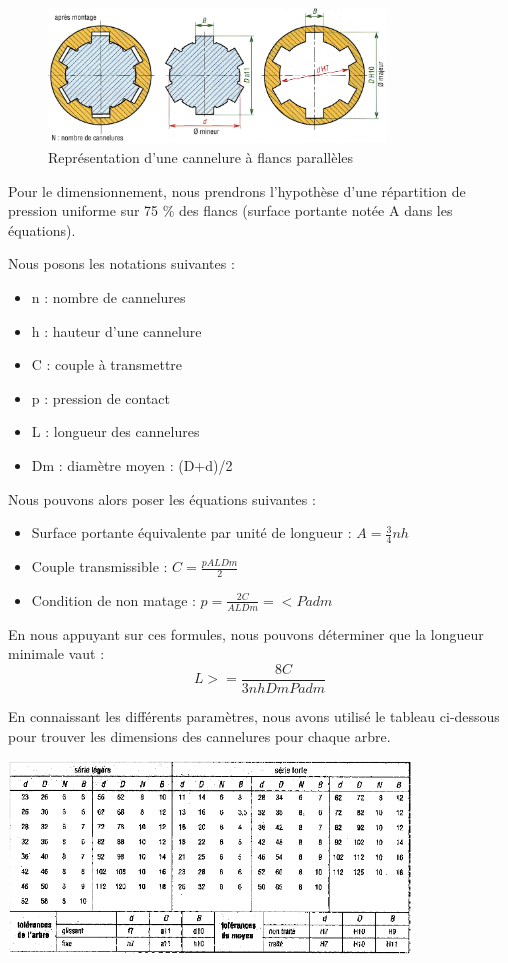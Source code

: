\documentclass{config}
\begin{document}
\begin{spacing}{1.2}
\begin{figure}[h!]
    \centering
    \includegraphics[width=0.8\textwidth]{cannelure_parallele.jpg}
    \caption{Représentation d'une cannelure à flancs parallèles}
\end{figure}

Pour le dimensionnement, nous prendrons l'hypothèse d'une répartition de pression uniforme sur 75 \% des flancs (surface portante notée A dans les équations).

Nous posons les notations suivantes :
\begin{itemize}
\item n : nombre de cannelures
\item h : hauteur d'une cannelure
\item C : couple à transmettre
\item p : pression de contact
\item L : longueur des cannelures
\item Dm : diamètre moyen : (D+d)/2
\end{itemize}

Nous pouvons alors poser les équations suivantes :

\begin{itemize}
    \item Surface portante équivalente par unité de longueur : $A = \frac{3}{4} n h$
    \item Couple transmissible : $C = \frac{p A L Dm}{2}$
    \item Condition de non matage : $p=  \frac{2 C}{A L Dm}=<  Padm$
\end{itemize} 

En nous appuyant sur ces formules, nous pouvons déterminer que la longueur minimale vaut :
\[L >= \frac{8 C}{3 n h Dm Padm}\]

En connaissant les différents paramètres, nous avons utilisé le tableau ci-dessous pour trouver les dimensions des cannelures pour chaque arbre.

\begin{center}
\includegraphics[width=0.8\textwidth]{tab_cannelures.PNG}
\end{center}
    

\end{spacing}
\end{document}
